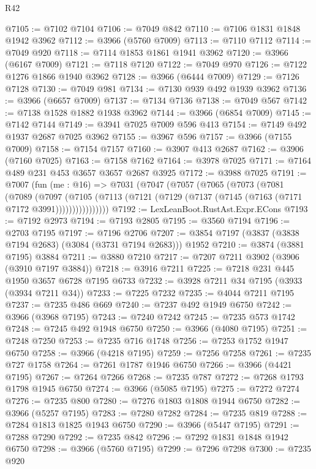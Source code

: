 \begin{lexlean}{R42}
\begin{coremodule}
@7105 := @7102 @7104
@7106 := @7049 @842
@7110 := @7106 @1831 @1848 @1942 @3962
@7112 := @3966 (@5760 @7009)
@7113 := @7110 @7112
@7114 := @7049 @920
@7118 := @7114 @1853 @1861 @1941 @3962
@7120 := @3966 (@6167 @7009)
@7121 := @7118 @7120
@7122 := @7049 @970
@7126 := @7122 @1276 @1866 @1940 @3962
@7128 := @3966 (@6444 @7009)
@7129 := @7126 @7128
@7130 := @7049 @981
@7134 := @7130 @939 @492 @1939 @3962
@7136 := @3966 (@6657 @7009)
@7137 := @7134 @7136
@7138 := @7049 @567
@7142 := @7138 @1528 @1882 @1938 @3962
@7144 := @3966 (@6854 @7009)
@7145 := @7142 @7144
@7149 := @3941 @7025 @7009 @596 @413
@7154 := @7149 @492 @1937 @2687 @7025 @3962
@7155 := @3967 @596
@7157 := @3966 (@7155 @7009)
@7158 := @7154 @7157
@7160 := @3907 @413 @2687
@7162 := @3906 (@7160 @7025)
@7163 := @7158 @7162
@7164 := @3978 @7025
@7171 := @7164 @489 @231 @453 @3657 @3657 @2687 @3925
@7172 := @3988 @7025
@7191 := @7007
    (fun (me : @16) =>
    @7031
      (@7047
        (@7057
          (@7065
            (@7073
              (@7081
                (@7089
                  (@7097
                    (@7105
                      (@7113 (@7121 (@7129 (@7137 (@7145 (@7163 (@7171 @7172 @3991))))))))))))))))
@7192 := LexLeanBoot.RustAst.Expr.ECons
@7193 := @7192 @2973
@7194 := @7193 @2805
@7195 := @3560 @7194
@7196 := @2703 @7195
@7197 := @7196 @2706
@7207 := @3854 @7197 (@3837 (@3838 @7194 @2683) (@3084 (@3731 @7194 @2683))) @1952
@7210 := @3874 (@3881 @7195) @3884
@7211 := @3880 @7210
@7217 := @7207 @7211 @3902 (@3906 (@3910 @7197 @3884))
@7218 := @3916 @7211
@7225 := @7218 @231 @445 @1950 @3657 @6728 @7195 @6733
@7232 := @3928 @7211 @34 @7195 (@3933 (@3934 @7211 @34))
@7233 := @7225 @7232
@7235 := @4044 @7211 @7195
@7237 := @7235 @486 @669
@7240 := @7237 @492 @1949 @6750
@7242 := @3966 (@3968 @7195)
@7243 := @7240 @7242
@7245 := @7235 @573 @1742
@7248 := @7245 @492 @1948 @6750
@7250 := @3966 (@4080 @7195)
@7251 := @7248 @7250
@7253 := @7235 @716 @1748
@7256 := @7253 @1752 @1947 @6750
@7258 := @3966 (@4218 @7195)
@7259 := @7256 @7258
@7261 := @7235 @727 @1758
@7264 := @7261 @1787 @1946 @6750
@7266 := @3966 (@4421 @7195)
@7267 := @7264 @7266
@7268 := @7235 @787
@7272 := @7268 @1793 @1798 @1945 @6750
@7274 := @3966 (@5085 @7195)
@7275 := @7272 @7274
@7276 := @7235 @800
@7280 := @7276 @1803 @1808 @1944 @6750
@7282 := @3966 (@5257 @7195)
@7283 := @7280 @7282
@7284 := @7235 @819
@7288 := @7284 @1813 @1825 @1943 @6750
@7290 := @3966 (@5447 @7195)
@7291 := @7288 @7290
@7292 := @7235 @842
@7296 := @7292 @1831 @1848 @1942 @6750
@7298 := @3966 (@5760 @7195)
@7299 := @7296 @7298
@7300 := @7235 @920

\end{coremodule}
\end{lexlean}
